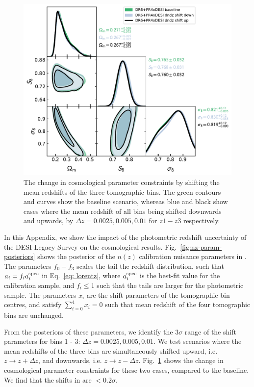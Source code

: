 \documentclass[twocolumn]{aastex631}
\begin{document}
{\begin{figure}
    \centering
\includegraphics[width=\linewidth]{figures/dndz_shifts.pdf}
    \caption{The change in cosmological parameter constraints by shifting the mean redshifts of the three tomographic bins. The green contours and curves show the baseline scenario, whereas blue and black show cases where the mean redshift of all bins being shifted downwards and upwards, by $\Delta z=0.0025,0.005,0.01$ for $z1-z3$ respectively.}
    \label{fig:dndz_shifts}
\end{figure}

In this Appendix, we show the impact of the photometric redshift uncertainty of the DESI Legacy Survey on the cosmological results. Fig.~\ref{fig:nz-param-posteriors} shows the posterior of the $n(z)$ calibration nuisance parameters in 
\cite{hang2021}. The parameters $f_0 - f_3$ scales the tail the redshift distribution, such that $a_i=f_i a_i^{\rm spec}$ in Eq.~\ref{eq: lorentz}, where $a_i^{\rm spec}$ is the best-fit value for the calibration sample, and $f_i\leq1$ such that the tails are larger for the photometric sample. The parameters $x_i$ are the shift parameters of the tomographic bin centres, and satisfy $\sum_{i=0}^{4} x_i=0$ such that mean redshift of the four tomographic bins are unchanged.

From the posteriors of these parameters, we identify the $3\sigma$ range of the shift parameters for bins 1 - 3: $\Delta z = 0.0025, 0.005, 0.01$. We test scenarios where the mean redshifts of the three bins are simultaneously shifted upward, i.e. $z\rightarrow z+\Delta z$, and downwards, i.e. $z\rightarrow z-\Delta z$. Fig.~\ref{fig:dndz_shifts} shows the change in cosmological parameter constraints for these two cases, compared to the baseline. We find that the shifts in are $<0.2\sigma$.

}
\end{document}
